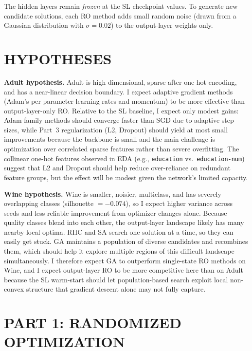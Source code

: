 \documentclass[letterpaper, 10 pt, conference]{ieeeconf}
\begin{document}
The hidden layers remain \emph{frozen} at the SL checkpoint values. To generate new candidate solutions, each RO method adds small random noise (drawn from a Gaussian distribution with $\sigma = 0.02$) to the output-layer weights only.

\section{HYPOTHESES}

\textbf{Adult hypothesis.} Adult is high-dimensional, sparse after one-hot encoding, and has a near-linear decision boundary. I expect adaptive gradient methods (Adam's per-parameter learning rates and momentum) to be more effective than output-layer-only RO. Relative to the SL baseline, I expect only modest gains: Adam-family methods should converge faster than SGD due to adaptive step sizes, while Part~3 regularization (L2, Dropout) should yield at most small improvements because the backbone is small and the main challenge is optimization over correlated sparse features rather than severe overfitting. The collinear one-hot features observed in EDA (e.g., \texttt{education} vs.\ \texttt{education-num}) suggest that L2 and Dropout should help reduce over-reliance on redundant feature groups, but the effect will be modest given the network's limited capacity.

\textbf{Wine hypothesis.} Wine is smaller, noisier, multiclass, and has severely overlapping classes (silhouette $= -0.074$), so I expect higher variance across seeds and less reliable improvement from optimizer changes alone. Because quality classes blend into each other, the output-layer landscape likely has many nearby local optima. RHC and SA search one solution at a time, so they can easily get stuck. GA maintains a population of diverse candidates and recombines them, which should help it explore multiple regions of this difficult landscape simultaneously. I therefore expect GA to outperform single-state RO methods on Wine, and I expect output-layer RO to be more competitive here than on Adult because the SL warm-start should let population-based search exploit local non-convex structure that gradient descent alone may not fully capture.

\section{PART 1: RANDOMIZED OPTIMIZATION}
\end{document}
